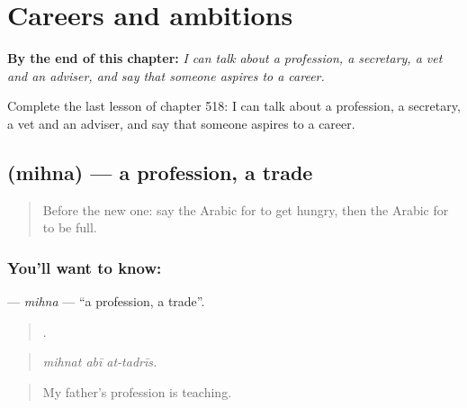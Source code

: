 
\chapter{Careers and ambitions}
\label{ch:ar-careers-and-ambitions}

\begin{chapteropening}
\textbf{By the end of this chapter:} \emph{I can talk about a profession, a secretary, a vet and an adviser, and say that someone aspires to a career.}

Complete the last lesson of chapter 518: I can talk about a profession, a secretary, a vet and an adviser, and say that someone aspires to a career.
\end{chapteropening}

\section[\texorpdfstring{\ar{مهنة} (mihna)}{مهنة (mihna)}]{ (mihna) — a profession, a trade}

\label{lesson:AR-C518-mihna}



\begin{quote}
Before the new one: say the Arabic for to get hungry, then the Arabic for to be full.
\end{quote}

\subsection*{You'll want to know: }
\textbf{} — \emph{mihna} — \textquotedblleft{}a profession, a trade\textquotedblright{}.

\begin{quote}
  .
\end{quote}

\begin{quote}
\emph{mihnat abī at-tadrīs.}
\end{quote}

\begin{quote}
My father's profession is teaching.
\end{quote}

